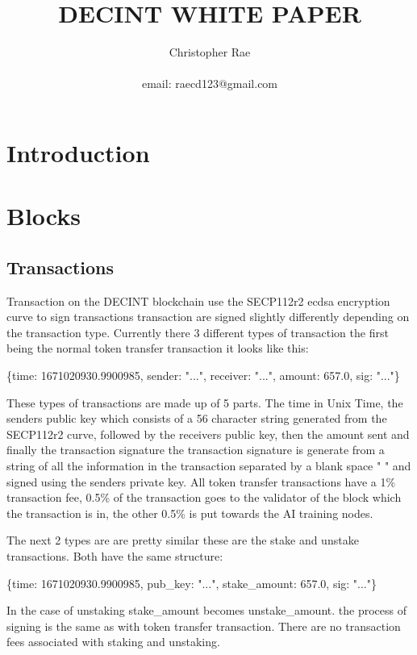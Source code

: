 \documentclass[11pt]{extarticle}
\title{DECINT WHITE PAPER}
\author{Christopher Rae \\ \begin{small} email: raecd123@gmail.com \end{small}}
\date{}
\begin{document}
\maketitle

\tableofcontents
\newpage
\section{Introduction}

\section{Blocks} 
\subsection{Transactions}
Transaction on the DECINT blockchain use the SECP112r2 ecdsa encryption curve to sign transactions transaction are signed slightly differently depending on the transaction type. Currently there 3 different types of transaction the first being the normal token transfer transaction it looks like this:
\
\begin{center}
\{time: 1671020930.9900985,  sender: "...",  receiver: "...",  amount: 657.0,  sig: "..."\}
\end{center}

These types of transactions are made up of 5 parts. The time in Unix Time, the senders public key which consists of a 56 character string generated from the SECP112r2 curve, followed by the receivers public key, then the amount sent and finally the transaction signature the transaction signature is generate from a string of all the information in the transaction separated by a blank space " " and signed using the senders private key. All token transfer transactions have a 1\% transaction fee, 0.5\% of the transaction goes to the validator of the block which the transaction is in, the other 0.5\% is put towards the AI training nodes.  

The next 2 types are are pretty similar these are the stake and unstake transactions. Both have the same structure:

\begin{center}
\{time: 1671020930.9900985,  pub\_key: "...",  stake\_amount: 657.0,  sig: "..."\}
\end{center}

In the case of unstaking stake\_amount becomes unstake\_amount. the process of signing is the same as with token transfer transaction. There are no transaction fees associated with staking and unstaking.
\end{document}
